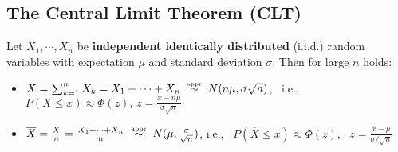 \documentclass{article}
\newcommand{\Tr}[2]{#1}
\def\Po{\mbox{Po}}
\def\Exp{\mbox{Exp}}
\newcommand\conj[1]{{\overline #1}}
\let\ob\conj
\begin{document}

\subsection*{\Tr{The Central Limit Theorem (CLT)}{Centrala gränsvärdessatsen (CGS)}} %

\Tr{%
Let $X_1,\cdots, X_n$ be \textbf{independent identically distributed}  (i.i.d.)
random variables with expectation $\mu$ and standard deviation $\sigma$. Then for large $n$
holds:
}{%
Låt $X_1,\cdots, X_n$ vara \textbf{oberoende likafördelade} stokastiska
variabler med väntevärde $\mu$ och standardavvikelse $\sigma$. För stora $n$
gäller:
}

\begin{itemize}
  \item $X=\sum_{k=1}^n \Tr{X}{X}_k=\Tr{X}{X}_1+\cdots+\Tr{X}{X}_n\;
    \stackrel{\mbox{\tiny appr}}{\sim}\; N(n\mu,\sigma\sqrt{n})$,
        \ \Tr{i.e.}{dvs}, \,
        $P(X\le x)\approx
        \Phi(z),\, z=\frac{x-n\mu}{\sigma\sqrt{n}}
        $

      \item $\Tr{\ob X}{\ob X}=\frac{X}n
    =\frac{\Tr{X}{X}_1+\cdots+\Tr{X}{X}_n}n\;
    \stackrel{\mbox{\tiny appr}}{\sim}\; N(\mu,\frac\sigma{\sqrt{n}})$,
    \hspace{26pt}\Tr{i.e.}{dvs}, \,
        $P(\Tr{\ob X}{\ob X}\le \ob x)\approx\Phi(z)$, \,
        $z=\frac{\ob x-\mu}{\sigma/\sqrt{n}}$
\end{itemize}
\end{document}
